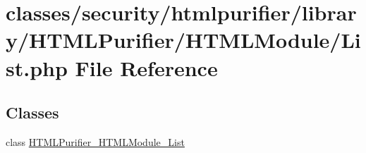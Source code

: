 \hypertarget{HTMLModule_2List_8php}{\section{classes/security/htmlpurifier/library/\+H\+T\+M\+L\+Purifier/\+H\+T\+M\+L\+Module/\+List.php File Reference}
\label{HTMLModule_2List_8php}
}
\subsection*{Classes}
\begin{DoxyCompactItemize}
\item 
class \hyperlink{classHTMLPurifier__HTMLModule__List}{H\+T\+M\+L\+Purifier\+\_\+\+H\+T\+M\+L\+Module\+\_\+\+List}
\end{DoxyCompactItemize}
